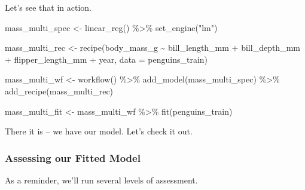\documentclass[
  letterpaper,
  DIV=11,
  numbers=noendperiod]{scrartcl}
\newenvironment{Shaded}{\begin{snugshade}}{\end{snugshade}}
\newcommand{\AttributeTok}[1]{\textcolor[rgb]{0.40,0.45,0.13}{#1}}
\newcommand{\FunctionTok}[1]{\textcolor[rgb]{0.28,0.35,0.67}{#1}}
\newcommand{\NormalTok}[1]{\textcolor[rgb]{0.00,0.23,0.31}{#1}}
\newcommand{\OtherTok}[1]{\textcolor[rgb]{0.00,0.23,0.31}{#1}}
\newcommand{\SpecialCharTok}[1]{\textcolor[rgb]{0.37,0.37,0.37}{#1}}
\newcommand{\StringTok}[1]{\textcolor[rgb]{0.13,0.47,0.30}{#1}}
\begin{document}
Let's see that in action.

\begin{Shaded}
\begin{Highlighting}[]
\NormalTok{mass\_multi\_spec }\OtherTok{\textless{}{-}} \FunctionTok{linear\_reg}\NormalTok{() }\SpecialCharTok{\%\textgreater{}\%}
  \FunctionTok{set\_engine}\NormalTok{(}\StringTok{"lm"}\NormalTok{)}

\NormalTok{mass\_multi\_rec }\OtherTok{\textless{}{-}} \FunctionTok{recipe}\NormalTok{(body\_mass\_g }\SpecialCharTok{\textasciitilde{}}\NormalTok{ bill\_length\_mm }\SpecialCharTok{+}\NormalTok{ bill\_depth\_mm }\SpecialCharTok{+}\NormalTok{ flipper\_length\_mm }\SpecialCharTok{+}\NormalTok{ year, }\AttributeTok{data =}\NormalTok{ penguins\_train)}

\NormalTok{mass\_multi\_wf }\OtherTok{\textless{}{-}} \FunctionTok{workflow}\NormalTok{() }\SpecialCharTok{\%\textgreater{}\%}
  \FunctionTok{add\_model}\NormalTok{(mass\_multi\_spec) }\SpecialCharTok{\%\textgreater{}\%}
  \FunctionTok{add\_recipe}\NormalTok{(mass\_multi\_rec)}

\NormalTok{mass\_multi\_fit }\OtherTok{\textless{}{-}}\NormalTok{ mass\_multi\_wf }\SpecialCharTok{\%\textgreater{}\%}
  \FunctionTok{fit}\NormalTok{(penguins\_train)}
\end{Highlighting}
\end{Shaded}

There it is -- we have our model. Let's check it out.

\subsubsection{Assessing our Fitted
Model}\label{assessing-our-fitted-model}

As a reminder, we'll run several levels of assessment.
\end{document}
